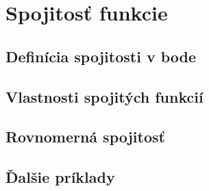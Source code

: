 \chapter{Spojitosť funkcie}%


\section{Definícia spojitosti v bode}


\section{Vlastnosti spojitých funkcií}


\section{Rovnomerná spojitosť}


\section{Ďalšie príklady}

